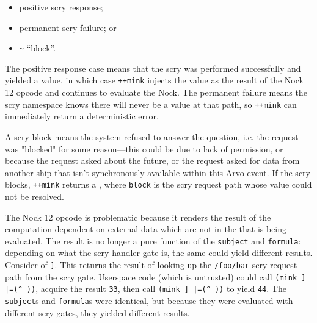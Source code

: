\documentclass[twoside]{article}
\begin{document}
\begin{itemize}
  \item  \texttt{} positive scry response;
  \item  \texttt{\string[\textasciitilde~\textasciitilde\string] }permanent scry failure; or
  \item  \texttt{\textasciitilde} ``block''.
\end{itemize}

\noindent
The positive response case means that the scry was performed successfully and yielded a value, in which case \texttt{++mink} injects the value as the result of the Nock 12 opcode and continues to evaluate the Nock.  The permanent failure means the scry namespace knows there will never be a value at that path, so \texttt{++mink} can immediately return a deterministic error.

A scry block means the system refused to answer the question, i.e. the request was "blocked" for some reason—this could be due to lack of permission, or because the request asked about the future, or the request asked for data from another ship that isn't synchronously available within this Arvo event. If the scry blocks, \texttt{++mink} returns a \texttt{}, where \texttt{block} is the scry request path whose value could not be resolved.

The Nock 12 opcode is problematic because it renders the result of the computation dependent on external data which are not in the \texttt{} that is being evaluated.  The result is no longer a pure function of the \texttt{subject} and \texttt{formula}:  depending on what the scry handler gate is, the same \texttt{} could yield different results.  Consider \texttt{} of \texttt{\string[0 \string[12 1 /foo/bar\string]\string]}.  This returns the result of looking up the \texttt{/foo/bar} scry request path from the scry gate. Userspace code (which is untrusted) could call \texttt{(mink \string[\string[0 12 1 /foo/bar\string]\string] |=(\string^ \string[\textasciitilde~\textasciitilde~33\string]))}, acquire the result \texttt{33}, then call \texttt{(mink \string[\string[0 12 1 /foo/bar\string]\string] |=(\string^ \string[\textasciitilde~\textasciitilde~44\string]))} to yield \texttt{44}.  The \texttt{subject}s and \texttt{formula}s were identical, but because they were evaluated with different scry gates, they yielded different results.
\end{document}
